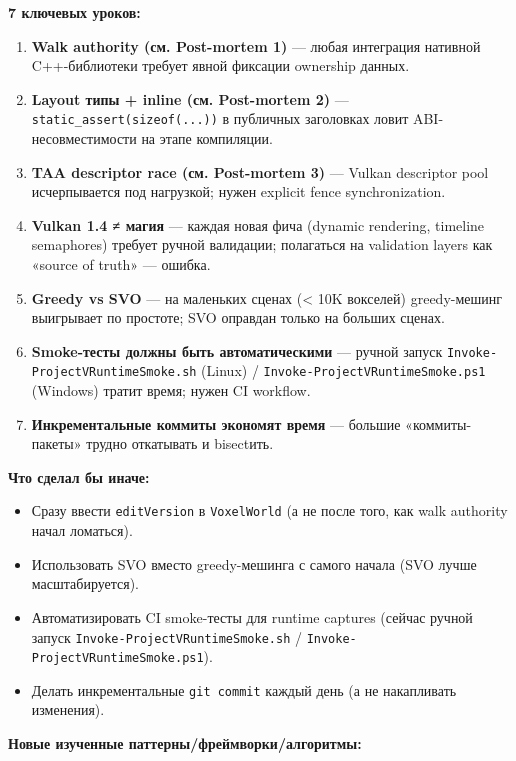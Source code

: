 \documentclass[
  11pt,a4paper,oneside]{article}
\providecommand{\tightlist}{%
  \setlength{\itemsep}{0pt}\setlength{\parskip}{0pt}}
\providecommand{\tightlist}{%
  \setlength{\itemsep}{0pt}\setlength{\parskip}{0pt}}
\begin{document}
\textbf{7 ключевых уроков:}

\begin{enumerate}
\def\labelenumi{\arabic{enumi}.}
\tightlist
\item
  \textbf{Walk authority (см. Post-mortem 1)} --- любая интеграция нативной C++-библиотеки требует явной фиксации ownership данных.
\item
  \textbf{Layout типы + inline (см. Post-mortem 2)} --- \texttt{static\_assert(sizeof(...))} в публичных заголовках ловит ABI-несовместимости на этапе компиляции.
\item
  \textbf{TAA descriptor race (см. Post-mortem 3)} --- Vulkan descriptor pool исчерпывается под нагрузкой; нужен explicit fence synchronization.
\item
  \textbf{Vulkan 1.4 ≠ магия} --- каждая новая фича (dynamic rendering, timeline semaphores) требует ручной валидации; полагаться на validation layers как «source of truth» --- ошибка.
\item
  \textbf{Greedy vs SVO} --- на маленьких сценах (\textless{} 10K вокселей) greedy-мешинг выигрывает по простоте; SVO оправдан только на больших сценах.
\item
  \textbf{Smoke-тесты должны быть автоматическими} --- ручной запуск \texttt{Invoke-ProjectVRuntimeSmoke.sh} (Linux) / \texttt{Invoke-ProjectVRuntimeSmoke.ps1} (Windows) тратит время; нужен CI workflow.
\item
  \textbf{Инкрементальные коммиты экономят время} --- большие «коммиты-пакеты» трудно откатывать и bisect\textquotesingle ить.
\end{enumerate}

\textbf{Что сделал бы иначе:}

\begin{itemize}
\tightlist
\item
  Сразу ввести \texttt{editVersion} в \texttt{VoxelWorld} (а не после того, как walk authority начал ломаться).
\item
  Использовать SVO вместо greedy-мешинга с самого начала (SVO лучше масштабируется).
\item
  Автоматизировать CI smoke-тесты для runtime captures (сейчас ручной запуск \texttt{Invoke-ProjectVRuntimeSmoke.sh} / \texttt{Invoke-ProjectVRuntimeSmoke.ps1}).
\item
  Делать инкрементальные \texttt{git\ commit} каждый день (а не накапливать изменения).
\end{itemize}

\textbf{Новые изученные паттерны/фреймворки/алгоритмы:}
\end{document}
